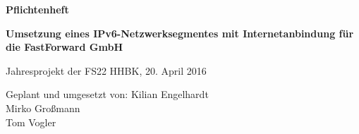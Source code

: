 \begin{titlepage}
	\begin{center}
		{\Large{\bf Pflichtenheft}}
	\end{center}
\vspace{2cm}
	\begin{center}
		{\LARGE{\bf Umsetzung eines IPv6-Netzwerksegmentes mit Internetanbindung für die FastForward GmbH}}
	\end{center}
\vspace{1cm}
	\begin{center}
		Jahresprojekt der FS22 HHBK, 20. April 2016
	\end{center}
\vfill
	\begin{flushleft}
		Geplant und umgesetzt von:\newline
		Kilian Engelhardt \\
		Mirko Großmann \\
		Tom Vogler
	\end{flushleft}
\end{titlepage}

